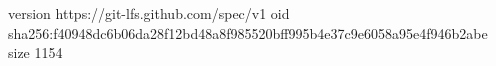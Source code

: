 version https://git-lfs.github.com/spec/v1
oid sha256:f40948dc6b06da28f12bd48a8f985520bff995b4e37c9e6058a95e4f946b2abe
size 1154
